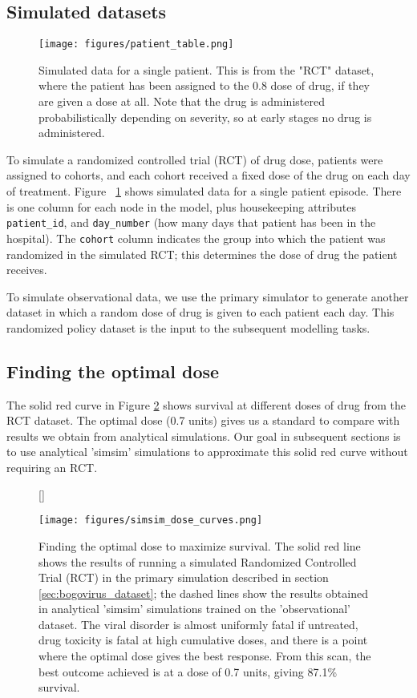\subsection{Simulated datasets}

\begin{figure}
  \centering
  \texttt{[image: figures/patient\_table.png]}
  \caption{Simulated data for a single patient. This is from the "RCT" dataset, where the patient has been assigned to the 0.8 dose of drug, if they are given a dose at all. Note that the drug is administered probabilistically depending on severity, so at early stages no drug is administered.}
  \label{fig:patient_table}
\end{figure}


To simulate a randomized controlled trial (RCT) of drug dose, patients were assigned to cohorts, and each cohort received a fixed dose of the drug on each day of treatment. Figure ~\ref{fig:patient_table} shows simulated data for a single patient episode. There is one column for each node in the model, plus housekeeping attributes \texttt{patient\_id}, and \texttt{day\_number} (how many days that patient has been in the hospital). The \texttt{cohort} column indicates the group into which the patient was randomized in the simulated RCT; this determines the dose of drug the patient receives.


To simulate observational data, we use the primary simulator to generate another dataset in which a random dose of drug is given to each patient each day. This randomized policy dataset is the input to the subsequent modelling tasks. 

\subsection{Finding the optimal dose}

The solid red curve in Figure \ref{fig:optimizing_dose} shows survival at different doses of drug from the RCT dataset. The optimal dose (0.7 units) gives us a standard to compare with results we obtain from analytical simulations. Our goal in subsequent sections is to use analytical 'simsim' simulations to approximate this solid red curve without requiring an RCT.

\begin{figure}
  \centering
  [\FBwidth]
  {  
    \caption{Finding the optimal dose to maximize survival. The solid red line shows the results of running a simulated Randomized Controlled Trial (RCT) in the primary simulation described in section \ref{sec:bogovirus_dataset}; the dashed lines show the results obtained in analytical 'simsim' simulations trained on the 'observational' dataset. The viral disorder is almost uniformly fatal if untreated, drug toxicity is fatal at high cumulative doses, and there is a point where the optimal dose gives the best response. From this scan, the best outcome achieved is at a dose of 0.7 units, giving 87.1\% survival.} 
  }
  {
    \texttt{[image: figures/simsim\_dose\_curves.png]}
    \label{fig:optimizing_dose}
  }
\end{figure}
